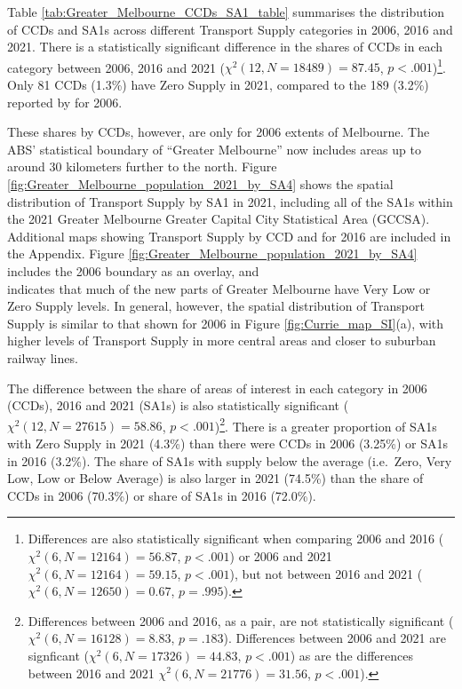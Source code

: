 \documentclass[preprint, 3p,
authoryear]{elsarticle} %
\begin{document}
Table \ref{tab:Greater_Melbourne_CCDs_SA1_table} summarises the
distribution of CCDs and SA1s across different Transport Supply
categories in 2006, 2016 and 2021. There is a statistically significant
difference in the shares of CCDs in each category between 2006, 2016 and
2021 (\(\chi^2(12, N = 18489) = 87.45\), \(p < .001\))\footnote{Differences
  are also statistically significant when comparing 2006 and 2016
  (\(\chi^2(6, N = 12164) = 56.87\), \(p < .001\)) or 2006 and 2021
  \(\chi^2(6, N = 12164) = 59.15\), \(p < .001\)), but not between 2016
  and 2021 (\(\chi^2(6, N = 12650) = 0.67\), \(p = .995\)).}. Only 81
CCDs (1.3\%) have Zero Supply in 2021, compared to the 189 (3.2\%)
reported by \citet{currie2010identifying} for 2006.

These shares by CCDs, however, are only for 2006 extents of Melbourne.
The ABS' statistical boundary of ``Greater Melbourne'' now includes
areas up to around 30 kilometers further to the north. Figure
\ref{fig:Greater_Melbourne_population_2021_by_SA4} shows the spatial
distribution of Transport Supply by SA1 in 2021, including all of the
SA1s within the 2021 Greater Melbourne Greater Capital City Statistical
Area (GCCSA). Additional maps showing Transport Supply by CCD and for
2016 are included in the Appendix. Figure
\ref{fig:Greater_Melbourne_population_2021_by_SA4} includes the 2006
boundary as an overlay, and\\
indicates that much of the new parts of Greater Melbourne have Very Low
or Zero Supply levels. In general, however, the spatial distribution of
Transport Supply is similar to that shown for 2006 in Figure
\ref{fig:Currie_map_SI}(a), with higher levels of Transport Supply in
more central areas and closer to suburban railway lines.

The difference between the share of areas of interest in each category
in 2006 (CCDs), 2016 and 2021 (SA1s) is also statistically significant
(\(\chi^2(12, N = 27615) = 58.86\), \(p < .001\))\footnote{Differences
  between 2006 and 2016, as a pair, are not statistically significant
  (\(\chi^2(6, N = 16128) = 8.83\), \(p = .183\)). Differences between
  2006 and 2021 are signficant (\(\chi^2(6, N = 17326) = 44.83\),
  \(p < .001\)) as are the differences between 2016 and 2021
  \(\chi^2(6, N = 21776) = 31.56\), \(p < .001\)).}. There is a greater
proportion of SA1s with Zero Supply in 2021 (4.3\%) than there were CCDs
in 2006 (3.25\%) or SA1s in 2016 (3.2\%). The share of SA1s with supply
below the average (i.e.~Zero, Very Low, Low or Below Average) is also
larger in 2021 (74.5\%) than the share of CCDs in 2006 (70.3\%) or share
of SA1s in 2016 (72.0\%).
\end{document}
